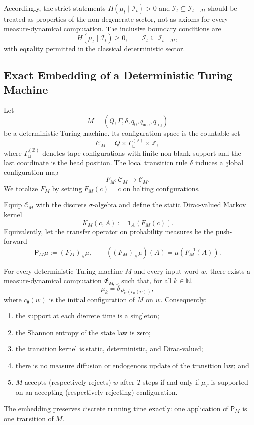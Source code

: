 Accordingly, the strict statements $H(\mu_t\mid\mathcal I_t)>0$ and
$\mathcal I_t\subsetneq\mathcal I_{t+\Delta t}$ should be treated as properties
of the non-degenerate sector, not as axioms for every measure-dynamical
computation.  The inclusive boundary conditions are
\[
  H(\mu_t\mid\mathcal I_t)\geq 0,
  \qquad
  \mathcal I_t\subseteq\mathcal I_{t+\Delta t},
\]
with equality permitted in the classical deterministic sector.

\subsection{Exact Embedding of a Deterministic Turing Machine}

Let
\[
  M=(Q,\Gamma,\delta,q_0,q_{\mathrm{acc}},q_{\mathrm{rej}})
\]
be a deterministic Turing machine.  Its configuration space is the countable
set
\[
  \mathcal C_M
  =Q\times\Gamma_{\sqcup}^{(\mathbb Z)}\times\mathbb Z,
\]
where $\Gamma_{\sqcup}^{(\mathbb Z)}$ denotes tape configurations with finite
non-blank support and the last coordinate is the head position.  The local
transition rule $\delta$ induces a global configuration map
\[
  F_M:\mathcal C_M\longrightarrow\mathcal C_M.
\]
We totalize $F_M$ by setting $F_M(c)=c$ on halting configurations.

Equip $\mathcal C_M$ with the discrete $\sigma$-algebra and define the static
Dirac-valued Markov kernel
\[
  K_M(c,A):=\mathbf 1_A(F_M(c)).
\]
Equivalently, let the transfer operator on probability measures be the
push-forward
\[
  \mathsf P_M\mu:=(F_M)_{\#}\mu,
  \qquad
  ((F_M)_{\#}\mu)(A)=\mu(F_M^{-1}(A)).
\]

\begin{theorem}
 For every deterministic Turing machine $M$ and every input word $w$, there
 exists a measure-dynamical computation $\mathfrak E_{M,w}$ such that, for all
 $k\in\mathbb N$,
 \[
   \mu_k=\delta_{F_M^k(c_0(w))},
 \]
 where $c_0(w)$ is the initial configuration of $M$ on $w$.  Consequently:
 \begin{enumerate}
   \item the support at each discrete time is a singleton;
   \item the Shannon entropy of the state law is zero;
   \item the transition kernel is static, deterministic, and Dirac-valued;
   \item there is no measure diffusion or endogenous update of the transition
         law; and
   \item $M$ accepts (respectively rejects) $w$ after $T$ steps if and only if
         $\mu_T$ is supported on an accepting (respectively rejecting)
         configuration.
 \end{enumerate}
 The embedding preserves discrete running time exactly: one application of
 $\mathsf P_M$ is one transition of $M$.
\end{theorem}

